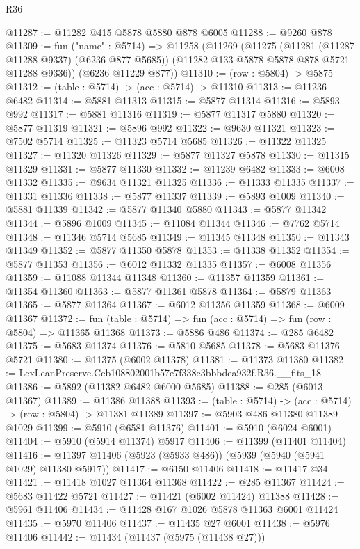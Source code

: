 \begin{lexlean}{R36}
\begin{coremodule}
@11287 := @11282 @415 @5878 @5880 @878 @6005
@11288 := @9260 @878
@11309 := fun ("name" : @5714) =>
  @11258
    (@11269
      (@11275
        (@11281 (@11287 @11288 @9337) (@6236 @877 @5685))
        (@11282 @133 @5878 @5878 @878 @5721 @11288 @9336))
      (@6236 @11229 @877))
@11310 := (row : @5804) -> @5875
@11312 := (table : @5714) -> (acc : @5714) -> @11310
@11313 := @11236 @6482
@11314 := @5881 @11313
@11315 := @5877 @11314
@11316 := @5893 @992
@11317 := @5881 @11316
@11319 := @5877 @11317 @5880
@11320 := @5877 @11319
@11321 := @5896 @992
@11322 := @9630 @11321
@11323 := @7502 @5714
@11325 := @11323 @5714 @5685
@11326 := @11322 @11325
@11327 := @11320 @11326
@11329 := @5877 @11327 @5878
@11330 := @11315 @11329
@11331 := @5877 @11330
@11332 := @11239 @6482
@11333 := @6008 @11332
@11335 := @9634 @11321 @11325
@11336 := @11333 @11335
@11337 := @11331 @11336
@11338 := @5877 @11337
@11339 := @5893 @1009
@11340 := @5881 @11339
@11342 := @5877 @11340 @5880
@11343 := @5877 @11342
@11344 := @5896 @1009
@11345 := @11084 @11344
@11346 := @7762 @5714
@11348 := @11346 @5714 @5685
@11349 := @11345 @11348
@11350 := @11343 @11349
@11352 := @5877 @11350 @5878
@11353 := @11338 @11352
@11354 := @5877 @11353
@11356 := @6012 @11332 @11335
@11357 := @6008 @11356
@11359 := @11088 @11344 @11348
@11360 := @11357 @11359
@11361 := @11354 @11360
@11363 := @5877 @11361 @5878
@11364 := @5879 @11363
@11365 := @5877 @11364
@11367 := @6012 @11356 @11359
@11368 := @6009 @11367
@11372 := fun (table : @5714) => fun (acc : @5714) => fun (row : @5804) => @11365 @11368
@11373 := @5886 @486
@11374 := @285 @6482
@11375 := @5683 @11374
@11376 := @5810 @5685
@11378 := @5683 @11376 @5721
@11380 := @11375 (@6002 @11378)
@11381 := @11373 @11380
@11382 := LexLeanPreserve.Ceb108802001b57e7f338e3bbbdea932f.R36.__fits_18
@11386 := @5892 (@11382 @6482 @6000 @5685)
@11388 := @285 (@6013 @11367)
@11389 := @11386 @11388
@11393 := (table : @5714) -> (acc : @5714) -> (row : @5804) -> @11381 @11389
@11397 := @5903 @486 @11380 @11389 @1029
@11399 := @5910 (@6581 @11376)
@11401 := @5910 (@6024 @6001)
@11404 := @5910 (@5914 @11374) @5917
@11406 := @11399 (@11401 @11404)
@11416 := @11397 @11406 (@5923 (@5933 @486)) (@5939 (@5940 (@5941 @1029) @11380 @5917))
@11417 := @6150 @11406
@11418 := @11417 @34
@11421 := @11418 @1027 @11364 @11368
@11422 := @285 @11367
@11424 := @5683 @11422 @5721
@11427 := @11421 (@6002 @11424) @11388
@11428 := @5961 @11406
@11434 := @11428 @167 @1026 @5878 @11363 @6001 @11424
@11435 := @5970 @11406
@11437 := @11435 @27 @6001
@11438 := @5976 @11406
@11442 := @11434 (@11437 (@5975 (@11438 @27)))

\end{coremodule}
\end{lexlean}
